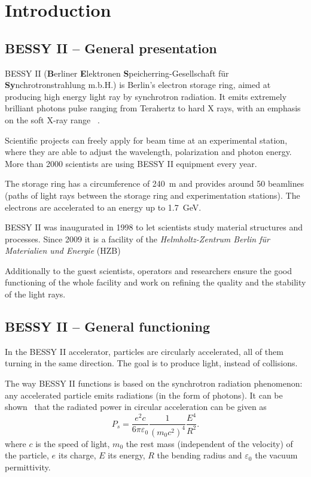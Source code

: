 
\chapter{Introduction}
\label{sec:background}

\section{BESSY II -- General presentation}
BESSY II (\textbf{B}erliner \textbf{E}lektronen \textbf{S}peicherring-Gesellschaft für \textbf{Sy}n\-chro\-tron\-strahlung m.b.H.) is Berlin's electron storage ring, aimed at producing high energy light ray by synchrotron radiation. It emits extremely brilliant photons pulse ranging from Terahertz to hard X rays, with an emphasis on the soft X-ray range ~\cite{web:bessy_homepage}.

Scientific projects can freely apply for beam time at an experimental station, where they are able to adjust the wavelength, polarization and photon energy. More than 2000 scientists are using BESSY II equipment every year.

The storage ring has a circumference of \SI{240}{\meter} and provides around 50 beamlines (paths of light rays between the storage ring and experimentation stations). The electrons are accelerated to an energy up to \SI{1.7}{\giga\electronvolt}.

BESSY II was inaugurated in 1998 to let scientists study material structures and processes. Since 2009 it is a facility of the \textit{Helmholtz-Zentrum Berlin für Materialien und Energie} (HZB)

Additionally to the guest scientists, operators and researchers ensure the good functioning of the whole facility and work on refining the quality and the stability of the light rays.

\section{BESSY II -- General functioning}
In the BESSY II  accelerator, particles are circularly accelerated, all of them turning in the same direction. The goal is to produce light, instead of collisions.

The way BESSY II functions is based on the synchrotron radiation phenomenon: any accelerated particle emits radiations (in the form of photons). It can be shown~\cite{book:wille} that the radiated power in circular acceleration can be given as
\begin{equation}
P_s = \frac{e^2 c}{6 \pi \varepsilon_0}\frac{1}{(m_0 c^2)^4}\frac{E^4}{R^2}.
\end{equation}
where $c$ is the speed of light, $m_0$ the rest mass (independent of the velocity) of the particle, $e$ its charge, $E$ its energy, $R$ the bending radius and $\varepsilon_0$ the  vacuum permittivity.

